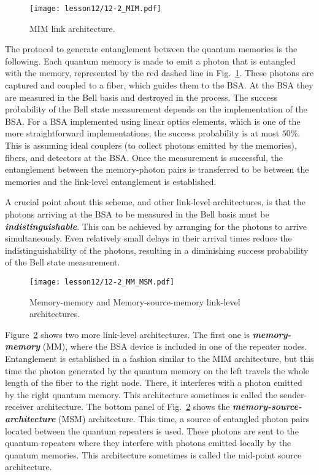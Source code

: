 \begin{figure}[t]
    \centering
    \texttt{[image: lesson12/12-2\_MIM.pdf]}
    \caption[MIM link architecture]{MIM link architecture.}
    \label{fig:12-2_MIM}
\end{figure}

The protocol to generate entanglement between the quantum memories is the following.
Each quantum memory is made to emit a photon that is entangled with the memory, represented by the red dashed line in Fig.~\ref{fig:12-2_MIM}.
These photons are captured and coupled to a fiber, which guides them to the BSA.
At the BSA they are measured in the Bell basis and destroyed in the process.
The success probability of the Bell state measurement depends on the implementation of the BSA.
For a BSA implemented using linear optics elements, which is one of the more straightforward implementations, the success probability is at most $50\%$.
This is assuming ideal couplers (to collect photons emitted by the memories), fibers, and detectors at the BSA.
Once the measurement is successful, the entanglement between the memory-photon pairs is transferred to be between the memories and the link-level entanglement is established.

A crucial point about this scheme, and other link-level architectures, is that the photons arriving at the BSA to be measured in the Bell basis must be \textit{\textbf{indistinguishable}}.
This can be achieved by arranging for the photons to arrive simultaneously. 
Even relatively small delays in their arrival times reduce the indistinguishability of the photons, resulting in a diminishing success probability of the Bell state measurement.

\begin{figure}[t]
    \centering
    \texttt{[image: lesson12/12-2\_MM\_MSM.pdf]}
    \caption[MM and MSM architectures]{Memory-memory and Memory-source-memory link-level architectures.}
    \label{fig:12-2_MM_MSM}
\end{figure}

Figure~\ref{fig:12-2_MM_MSM} shows two more link-level architectures.
The first one is \textit{\textbf{memory-memory}} (MM), where the BSA device is included in one of the repeater nodes.
Entanglement is established in a fashion similar to the MIM architecture, but this time the photon generated by the quantum memory on the left travels the whole length of the fiber to the right node.
There, it interferes with a photon emitted by the right quantum memory.
This architecture sometimes is called the sender-receiver architecture.
The bottom panel of Fig.~\ref{fig:12-2_MM_MSM} shows the \textit{\textbf{memory-source-architecture}} (MSM) architecture.
This time, a source of entangled photon pairs located between the quantum repeaters is used.
These photons are sent to the quantum repeaters where they interfere with photons emitted locally by the quantum memories. This architecture sometimes is called the mid-point source architecture.



